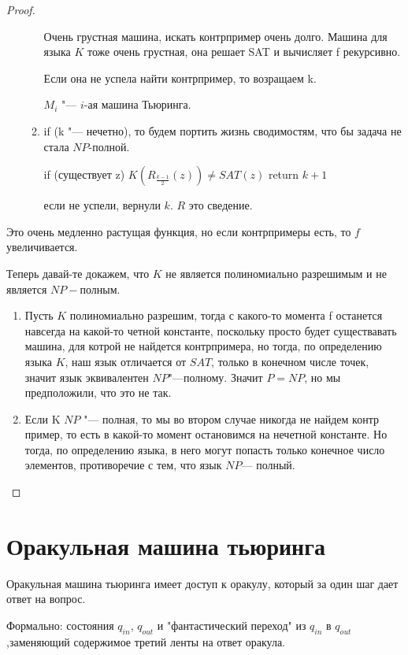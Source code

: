 \begin{proof}
\begin{enumerate}
\begin{enumerate}
    	    	Очень грустная машина, искать контрпример очень долго. Машина для языка $K$ тоже 
    		очень грустная, она решает SAT и вычисляет f рекурсивно. 

    		Если она не успела найти контрпример, то возращаем k. 
    
    		$M_i$ "--- $i$-ая машина Тьюринга. 
    		\item if (k "--- нечетно), то будем портить  жизнь сводимостям, что бы задача не стала $NP$-полной. 

    		if (существует z) $K(R_{\frac{k - 1}{2}}(z)) \ne SAT(z)$ return $k + 1$
    		
    		если не успели, вернули $k$. $R$ это сведение. 
    	\end{enumerate} 
	\end{enumerate}

	Это очень медленно растущая функция, но если контрпримеры есть, то $f$ увеличивается.

	Теперь давай-те докажем, что $K$  не является полиномиально разрешимым и не является $NP-$полным. 
	\begin{enumerate}
		\item Пусть $K$ полиномиально разрешим, тогда с какого-то момента f останется навсегда на какой-то 
		четной константе, поскольку просто будет существавать машина, для котрой не найдется контрпримера, но тогда, 
		по определению языка $K$, наш язык отличается от $SAT$, только в конечном числе точек, значит 
		язык эквивалентен $NP$"---полному. Значит $P = NP$, но мы предположили, что это не так. 	
		\item Если K $NP$ "--- полная, то мы во втором случае никогда не найдем контр пример, то 
		есть в какой-то момент остановимся на нечетной константе. 
		Но тогда, по определению языка, в него могут попасть только конечное число элементов, противоречие с тем, что язык $NP$--- полный. 
\end{enumerate}
\end{proof}



\section{Оракульная машина тьюринга}
Оракульная машина тьюринга имеет доступ к оракулу, который за один шаг
дает ответ на вопрос. 

Формально: состояния $q_{in}$, $q_{out}$  и "фантастический переход" из 
$q_{in}$ в $q_{out}$,заменяющий содержимое третий ленты на ответ оракула. 

